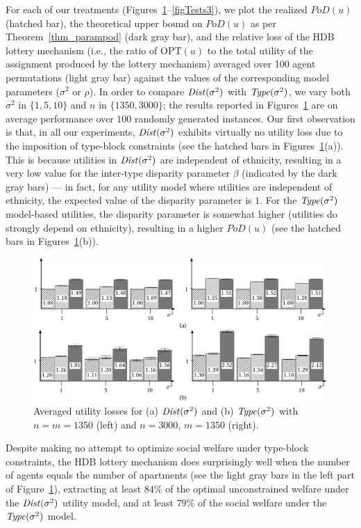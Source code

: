 \documentclass[11pt,dvipdfmx]{article}
\newcommand{\OPT}{\mathrm{OPT}}
\newcommand{\PoD}{\mathit{PoD}}
\begin{document}
For each of our treatments (Figures~\ref{figTests1}--\ref{figTests3}), we plot the realized $\PoD(u)$ (hatched bar), the theoretical upper bound on $\PoD(u)$ as per Theorem~\ref{thm_parampod} (dark gray bar), and the relative loss of the HDB lottery mechanism (i.e., the ratio of $\OPT(u)$ to the total utility of the assignment produced by the lottery mechanism) averaged over 100 agent permutations (light gray bar) against the values of the corresponding model parameters ($\sigma^2$ or $\rho$). 
In order to compare $\operatorname{\mathit{Dist}}(\sigma^2)$ with $\operatorname{\mathit{Type}}(\sigma^2)$, we vary both $\sigma^2$ in $\{1,5,10\}$ and $n$ in $\{1350, 3000\}$; 
the results reported in Figures~\ref{figTests1} are on average performance over $100$ randomly generated instances. 
Our first observation is that, in all our experiments, $\operatorname{\mathit{Dist}}(\sigma^2)$ exhibits virtually no utility loss due to the imposition of type-block constraints (see the hatched bars in Figures~\ref{figTests1}(a)). 
This is because utilities in $\operatorname{\mathit{Dist}}(\sigma^2)$ are independent of ethnicity, resulting in a very low value for the inter-type disparity parameter $\beta$ (indicated by the dark gray bars) --- in fact, for any utility model where utilities are independent of ethnicity, the expected value of the disparity parameter is $1$. 
For the $\operatorname{\mathit{Type}}(\sigma^2)$ model-based utilities, the disparity parameter is somewhat higher (utilities do strongly depend on ethnicity), resulting in a higher $\PoD(u)$ (see the hatched bars in Figures~\ref{figTests1}(b)). 
\begin{figure}[t]
	\begin{center}
		\includegraphics[scale=0.21]{figs/sing1.png}
	\end{center}
	\caption{Averaged utility losses for (a) $\operatorname{\mathit{Dist}}(\sigma^2)$ and (b) $\operatorname{\mathit{Type}}(\sigma^2)$ with $n = m = 1350$ (left) and $n = 3000$, $m = 1350$ (right). \label{figTests1}}
\end{figure}
Despite making no attempt to optimize social welfare under type-block constraints, the HDB lottery mechanism does surprisingly well when the number of agents equals the number of apartments (see the light gray bars in the left part of Figure~\ref{figTests1}), extracting at least $84\%$ of the optimal unconstrained welfare under the $\operatorname{\mathit{Dist}}(\sigma^2)$ utility model, and at least $79\%$ of the social welfare under the $\operatorname{\mathit{Type}}(\sigma^2)$ model. 
\end{document}
